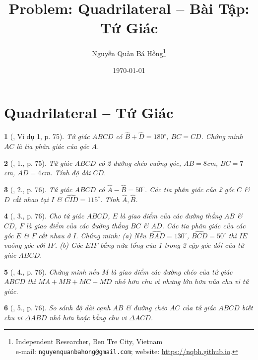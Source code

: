 \documentclass{article}
\title{Problem: Quadrilateral -- Bài Tập: Tứ Giác}
\author{Nguyễn Quản Bá Hồng\footnote{Independent Researcher, Ben Tre City, Vietnam\\e-mail: \texttt{nguyenquanbahong@gmail.com}; website: \url{https://nqbh.github.io}.}}
\date{\today}
\newtheorem{baitoan}{}
\begin{document}
\maketitle
\tableofcontents


\section{Quadrilateral -- Tứ Giác}

\begin{baitoan}[\cite{Binh_Toan_8_tap_1}, Ví dụ 1, p. 75]
	Tứ giác $ABCD$ có $\widehat{B} + \widehat{D} = 180^\circ$, $BC = CD$. Chứng minh $AC$ là tia phân giác của góc $A$.
\end{baitoan}

\begin{baitoan}[\cite{Binh_Toan_8_tap_1}, 1., p. 75]
	Tứ giác $ABCD$ có 2 đường chéo vuông góc, $AB = 8${\rm cm}, $BC = 7${\rm cm}, $AD = 4${\rm cm}. Tính độ dài $CD$.
\end{baitoan}

\begin{baitoan}[\cite{Binh_Toan_8_tap_1}, 2., p. 76]
	Tứ giác $ABCD$ có $\widehat{A} - \widehat{B} = 50^\circ$. Các tia phân giác của 2 góc $C$ \& $D$ cắt nhau tại $I$ \& $\widehat{CID} = 115^\circ$. Tính $\widehat{A},\widehat{B}$.
\end{baitoan}

\begin{baitoan}[\cite{Binh_Toan_8_tap_1}, 3., p. 76]
	Cho tứ giác $ABCD$, $E$ là giao điểm của các đường thẳng $AB$ \& $CD$, $F$ là giao điểm của các đường thẳng $BC$ \& $AD$. Các tia phân giác của các góc $E$ \& $F$ cắt nhau ở $I$. Chứng minh: (a) Nếu $\widehat{BAD} = 130^\circ$, $\widehat{BCD} = 50^\circ$ thì $IE$ vuông góc với $IF$. (b) Góc $EIF$ bằng nửa tổng của 1 trong 2 cặp góc đối của tứ giác $ABCD$.
\end{baitoan}

\begin{baitoan}[\cite{Binh_Toan_8_tap_1}, 4., p. 76]
	Chứng minh nếu $M$ là giao điểm các đường chéo của tứ giác $ABCD$ thì $MA + MB + MC + MD$ nhỏ hơn chu vi nhưng lớn hơn nửa chu vi tứ giác.
\end{baitoan}

\begin{baitoan}[\cite{Binh_Toan_8_tap_1}, 5., p. 76]
	So sánh độ dài cạnh $AB$ \& đường chéo $AC$ của tứ giác $ABCD$ biết chu vi $\Delta ABD$ nhỏ hơn hoặc bằng chu vi $\Delta ACD$.
\end{baitoan}
\end{document}
